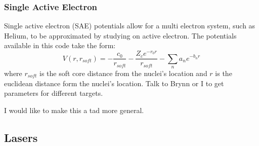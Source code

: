 \documentclass{article}
\begin{document}
\subsubsection{Single Active Electron} %
\label{ssub:single_active_electron}
Single active electron (SAE) potentials allow for a multi electron system, such as Helium, to be approximated by studying on active electron. The potentials available in this code take the form:
\begin{equation}
  V(r, r_{soft}) = - \frac{c_0}{r_{soft}} - \frac{Z_c e^{-r_0 r}}{r_{soft}} - \sum_n a_n e^{-b_n r}
    \label{eq:SAE}
\end{equation}
where $r_{soft}$ is the soft core distance from the nuclei's location and $r$ is the euclidean distance form the nuclei's location. Talk to Brynn or I to get parameters for different targets.

I would like to make this a tad more general.

\subsection{Lasers} %
\label{sub:lasers}
\end{document}
